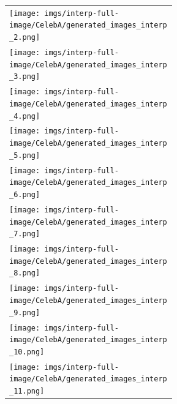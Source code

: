 \documentclass{article}
\begin{document}
\begin{appendices}
\begin{figure}[H]
{\begin{tabular}{C{0.35\linewidth}}
            \texttt{[image: imgs/interp-full-image/CelebA/generated\_images\_interp\_2.png]} \\
            \texttt{[image: imgs/interp-full-image/CelebA/generated\_images\_interp\_3.png]} \\
            \texttt{[image: imgs/interp-full-image/CelebA/generated\_images\_interp\_4.png]} \\
            \texttt{[image: imgs/interp-full-image/CelebA/generated\_images\_interp\_5.png]} \\
            \texttt{[image: imgs/interp-full-image/CelebA/generated\_images\_interp\_6.png]} \\
            \texttt{[image: imgs/interp-full-image/CelebA/generated\_images\_interp\_7.png]} \\
            \texttt{[image: imgs/interp-full-image/CelebA/generated\_images\_interp\_8.png]} \\
            \texttt{[image: imgs/interp-full-image/CelebA/generated\_images\_interp\_9.png]} \\
            \texttt{[image: imgs/interp-full-image/CelebA/generated\_images\_interp\_10.png]} \\
            \texttt{[image: imgs/interp-full-image/CelebA/generated\_images\_interp\_11.png]} \\
        \end{tabular}}
        

\end{figure}
\end{appendices}
\end{document}
